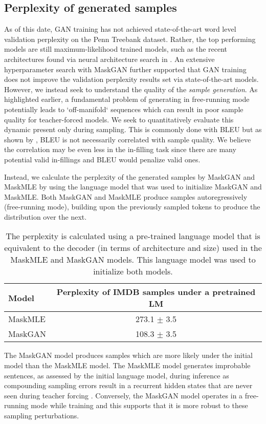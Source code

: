 \subsection{Perplexity of generated samples}
As of this date, GAN training has not achieved state-of-the-art word level validation perplexity on the Penn Treebank dataset.  Rather, the top performing models are still maximum-likelihood trained models, such as the recent architectures found via neural architecture search in \cite{zoph2016neural}.  An extensive hyperparameter search with MaskGAN further supported that GAN training does not improve the validation perplexity results set via state-of-the-art models.  However, we instead seek to understand the quality of the \textit{sample generation}.  As highlighted earlier, a fundamental problem of generating in free-running mode potentially leads to `off-manifold` sequences which can result in poor sample quality for teacher-forced models.  We seek to quantitatively evaluate this dynamic present only during sampling. This is commonly done with BLEU but as shown by \cite{gnmt}, BLEU is not necessarily correlated with sample quality. We believe the correlation may be even less in the in-filling task since there are many potential valid in-fillings and BLEU would penalize valid ones.

Instead, we calculate the perplexity of the generated samples by MaskGAN and MaskMLE by using the language model that was used to initialize MaskGAN and MaskMLE.  Both MaskGAN and MaskMLE produce samples autoregressively (free-running mode), building upon the previously sampled tokens to produce the distribution over the next.    

\begin{table}
  \centering
  \begin{tabular}{lc}
    \toprule
    Model & Perplexity of IMDB samples under a pretrained LM \\
    \midrule
    MaskMLE & 273.1 $\pm$ 3.5 \\
MaskGAN & 108.3 $\pm$ 3.5 \\
\bottomrule
  \end{tabular}
  \caption{The perplexity is calculated using a pre-trained language model that is equivalent to the decoder (in terms of architecture and size) used in the MaskMLE and MaskGAN models. This language model was used to initialize both models.}
\end{table}

The MaskGAN model produces samples which are more likely under the initial model than the MaskMLE model.  The MaskMLE model generates improbable sentences, as assessed by the initial language model, during inference as compounding sampling errors result in a recurrent hidden states that are never seen during teacher forcing \citep{lamb2016professor}.  Conversely, the MaskGAN model operates in a free-running mode while training and this supports that it is more robust to these sampling perturbations.


